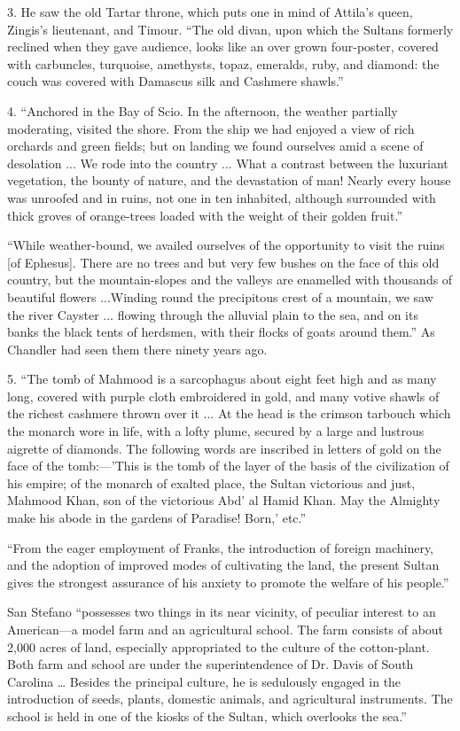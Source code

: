 3. He saw the old Tartar
throne, which puts one in mind of Attila's queen, Zingis's lieutenant,
and Timour. ``The old divan, upon which the Sultans formerly reclined
when they gave audience, looks like an over grown four-poster, covered
with carbuncles, turquoise, amethysts, topaz, emeralds, ruby, and
diamond: the couch was covered with Damascus silk and Cashmere shawls.''

4. ``Anchored in the Bay of
Scio. In the afternoon, the weather partially moderating, visited the
shore. From the ship we had enjoyed a view of rich orchards and green
fields; but on landing we found ourselves amid a scene of desolation
... We rode into the country ... What a contrast between the luxuriant
vegetation, the bounty of nature, and the devastation of man! Nearly
every house was unroofed and in ruins, not one in ten inhabited,
although surrounded with thick groves of orange-trees loaded with the
weight of their golden fruit.''

``While
weather-bound, we availed ourselves of the opportunity to visit the
ruins [of Ephesus]. There are no trees and but very few bushes on the
face of this old country, but the mountain-slopes and the valleys are
enamelled with thousands of beautiful flowers ...Winding round the
precipitous crest of a mountain, we saw the river Cayster ... flowing
through the alluvial plain to the sea, and on its banks the black
tents of herdsmen, with their flocks of goats around them.'' As
Chandler had seen them there ninety years ago.

5. ``The tomb of Mahmood is a
sarcophagus about eight feet high and as many long, covered with
purple cloth embroidered in gold, and many votive shawls of the
richest cashmere thrown over it ... At the head is the crimson
tarbouch which the monarch wore in life, with a lofty plume, secured
by a large and lustrous aigrette of diamonds. The following words are
inscribed in letters of gold on the face of the tomb:—'This is the
tomb of the layer of the basis of the civilization of his empire; of
the monarch of exalted place, the Sultan victorious and just, Mahmood
Khan, son of the victorious Abd' al Hamid Khan. May the Almighty make
his abode in the gardens of Paradise! Born,' etc.''

``From
the eager employment of Franks, the introduction of foreign machinery,
and the adoption of improved modes of cultivating the land, the
present Sultan gives the strongest assurance of his anxiety to promote
the welfare of his people.''

San Stefano ``possesses two
things in its near vicinity, of peculiar interest to an American—a
model farm and an agricultural school. The farm consists of about
2,000 acres of land, especially appropriated to the culture of the
cotton-plant. Both farm and school are under the superintendence of
Dr. Davis of South Carolina … Besides the principal culture, he is
sedulously engaged in the introduction of seeds, plants, domestic
animals, and agricultural instruments. The school is held in one of
the kiosks of the Sultan, which overlooks the sea.''

